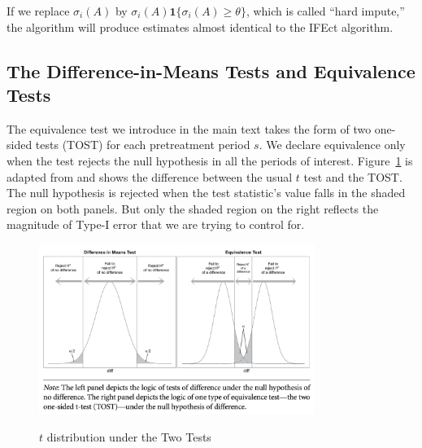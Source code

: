 \documentclass[12pt]{article}
\let\oldcenter\center
\let\oldendcenter\endcenter
\renewenvironment{center}{\setlength\topsep{0pt}\oldcenter}{\oldendcenter}
\begin{document}
\noindent If we replace  $\sigma_{i}(A)$ by $\sigma_{i}(A) \mathbf{1}\{\sigma_{i}(A) \geq \theta \}$, which is called ``hard impute,'' the algorithm will produce estimates almost identical to the IFEct algorithm.  

\bigskip
\clearpage

\subsection{The Difference-in-Means Tests and Equivalence Tests}\label{sc:equiv}

The equivalence test we introduce in the main text takes the form of two one-sided tests (TOST) for each pretreatment period $s$. We declare equivalence only when the test rejects the null hypothesis in all the periods of interest. Figure~\ref{fg:tost} is adapted from \citet{hartman2018equivalence} and shows the difference between the usual $t$ test and the TOST. The null hypothesis is rejected when the test statistic's value falls in the shaded region on both panels. But only the shaded region on the right reflects the magnitude of Type-I error that we are trying to control for.

\begin{figure}[!th]
\caption{$t$ distribution under the Two Tests}\label{fg:tost}
\centering
\begin{minipage}{0.9\linewidth}{
\begin{center}
\includegraphics[trim=0 .5em 0 .5em,clip,width = 0.8\textwidth]{TOST_HH.png}\\
\end{center}
}
\end{minipage}
\end{figure}
\FloatBarrier
\end{document}

